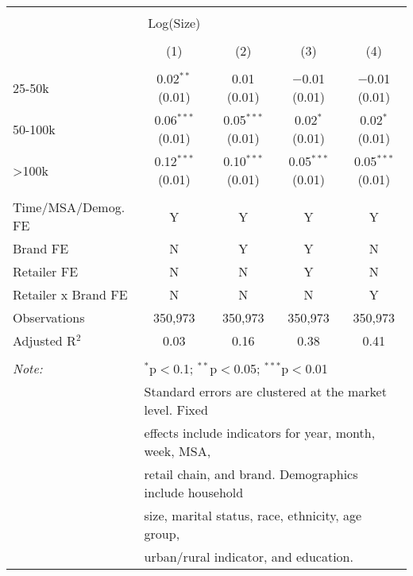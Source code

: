 
\begin{table}[!htbp] \centering 
  \caption{} 
  \label{tab:packageSizeFull7270} 
\begin{tabular}{@{\extracolsep{5pt}}lcccc} 
\\[-1.8ex]\hline 
\hline \\[-1.8ex] 
 & Log(Size) &  &  &  \\ 
\\[-1.8ex] & (1) & (2) & (3) & (4)\\ 
\hline \\[-1.8ex] 
 25-50k & 0.02$^{**}$ (0.01) & 0.01 (0.01) & $-$0.01 (0.01) & $-$0.01 (0.01) \\ 
  50-100k & 0.06$^{***}$ (0.01) & 0.05$^{***}$ (0.01) & 0.02$^{*}$ (0.01) & 0.02$^{*}$ (0.01) \\ 
  >100k & 0.12$^{***}$ (0.01) & 0.10$^{***}$ (0.01) & 0.05$^{***}$ (0.01) & 0.05$^{***}$ (0.01) \\ 
 \hline \\[-1.8ex] 
Time/MSA/Demog. FE & Y & Y & Y & Y \\ 
Brand FE & N & Y & Y & N \\ 
Retailer FE & N & N & Y & N \\ 
Retailer x Brand FE & N & N & N & Y \\ 
Observations & 350,973 & 350,973 & 350,973 & 350,973 \\ 
Adjusted R$^{2}$ & 0.03 & 0.16 & 0.38 & 0.41 \\ 
\hline 
\hline \\[-1.8ex] 
\textit{Note:}  & \multicolumn{4}{l}{$^{*}$p$<$0.1; $^{**}$p$<$0.05; $^{***}$p$<$0.01} \\ 
 & \multicolumn{4}{l}{Standard errors are clustered at the market level. Fixed } \\ 
 & \multicolumn{4}{l}{effects include indicators for year, month, week, MSA, } \\ 
 & \multicolumn{4}{l}{retail chain, and brand. Demographics include household } \\ 
 & \multicolumn{4}{l}{size, marital status, race, ethnicity, age group, } \\ 
 & \multicolumn{4}{l}{urban/rural indicator, and education.} \\ 
\end{tabular} 
\end{table} 
